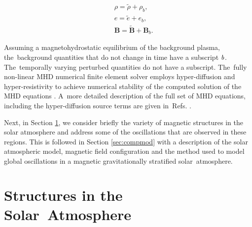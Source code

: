 \documentclass[physics,article,accept,pdftex,moreauthors]{Definitions/mdpi}
\begin{document}
\begin{eqnarray}
&& \rho = \tilde{\rho}+\rho_b, \nonumber \\
&& e = \tilde{e}+e_b,  \nonumber \\
&& {\mathbf B} = \tilde{\mathbf B}+{\mathbf B}_b.  \nonumber 
\end{eqnarray}

Assuming a magnetohydrostatic equilibrium of the background plasma, the~background quantities that do not change in time have a subscript $\it{b}$. The~temporally varying perturbed quantities do not have a subscript. The~fully non-linear MHD numerical finite element solver employs hyper-diffusion and hyper-resistivity to achieve numerical stability of the computed solution of the MHD equations \cite{Caunt2001}. A~more detailed description of the full set of MHD equations, including the hyper-diffusion source terms are given 
in~{Refs.} 
\cite{Griffiths2015,Shelyag2008}.



{Next, in Section} \ref{sec:structures}, %
 we consider briefly the variety of magnetic structures in the solar atmosphere and address some of the oscillations that are 
observed in these regions. This is followed {in Section} \ref{sec:compmod} 
with a description of the solar atmospheric model, magnetic field configuration and the method used to  model global oscillations in a magnetic gravitationally stratified solar~atmosphere.
\section{Structures in the Solar~Atmosphere}

\label{sec:structures}
\end{document}

